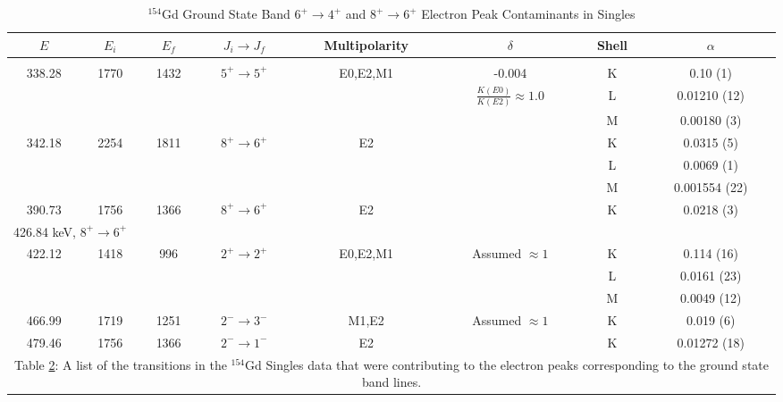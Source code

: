 \begin{table}[!]
    \centering
    \small
    \begin{longtable}{c|c|c|c|c|c|c|c}
        \caption{$^{154}$Gd Ground State Band $6^+\rightarrow 4^+$ and $8^+\rightarrow 6^+$ Electron Peak Contaminants in Singles}
        \label{tab:154Gd_Contaminants} \\
        \toprule
         $E$ & $E_i$ & $E_f$ & $J_i\rightarrow J_f$ & Multipolarity & $\delta$ & Shell & $\alpha$  \\ \hline
         \endhead
         \endfoot
         \endlastfoot
         \multicolumn{8}{l}{346.59 keV, $6^+\rightarrow 4^+$} \\ \hline
         338.28 & 1770 & 1432 & $5^+\rightarrow 5^+$ & E0,E2,M1 & -0.004 & K & 0.10 (1) \\ 
         & & & & & $\frac{K(E0)}{K(E2)}\approx 1.0$ & L & 0.01210 (12) \\ 
         & & & & & & M & 0.00180 (3) \\ \hline
         342.18 & 2254 & 1811 & $8^+\rightarrow 6^+$ & E2 & & K & 0.0315 (5) \\ 
         & & & & & & L & 0.0069 (1) \\\
         & & & & & & M & 0.001554 (22) \\ \hline
         390.73 & 1756 & 1366 & $8^+\rightarrow 6^+$ & E2 & & K & 0.0218 (3) \\ \hline
         \multicolumn{8}{l}{426.84 keV, $8^+\rightarrow 6^+$} \\ \hline
         422.12 & 1418 & 996 & $2^+\rightarrow 2^+$ & E0,E2,M1 & Assumed $\approx 1$ & K & 0.114 (16) \\ 
         & & & & & & L & 0.0161 (23) \\ 
         & & & & & & M & 0.0049 (12) \\ \hline
         466.99 & 1719 & 1251 & $2^-\rightarrow 3^-$ & M1,E2 & Assumed $\approx 1$ & K & 0.019 (6) \\ \hline
         479.46 & 1756 & 1366 & $2^-\rightarrow 1^-$ & E2 & & K & 0.01272 (18) \\
         \bottomrule
         \multicolumn{8}{p{\textwidth}}{Table \ref{tab:154Gd_Contaminants}: A list of the transitions in the $^{154}$Gd Singles data that were contributing to the electron peaks corresponding to the ground state band lines.}
    \end{longtable}
\end{table}